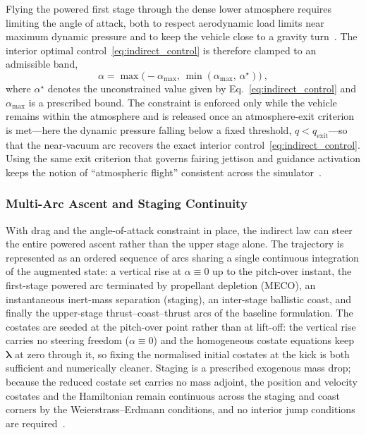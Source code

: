 Flying the powered first stage through the dense lower atmosphere requires limiting the angle of attack, both to respect aerodynamic load limits near maximum dynamic pressure and to keep the vehicle close to a gravity turn~\cite{Cremaschi2013TrajectoryOptimization}. The interior optimal control~\eqref{eq:indirect_control} is therefore clamped to an admissible band,
\begin{equation}
\alpha = \max\!\bigl(-\alpha_{\max},\,\min(\alpha_{\max},\,\alpha^{\star})\bigr) \ ,
\label{eq:fa_alpha_clamp}
\end{equation}
where $\alpha^{\star}$ denotes the unconstrained value given by Eq.~\eqref{eq:indirect_control} and $\alpha_{\max}$ is a prescribed bound. The constraint is enforced only while the vehicle remains within the atmosphere and is released once an atmosphere-exit criterion is met---here the dynamic pressure falling below a fixed threshold, $q < q_{\mathrm{exit}}$---so that the near-vacuum arc recovers the exact interior control~\eqref{eq:indirect_control}. Using the same exit criterion that governs fairing jettison and guidance activation keeps the notion of ``atmospheric flight'' consistent across the simulator~\cite{gath2001optimization}.

\subsubsection{Multi-Arc Ascent and Staging Continuity}
\label{sssec:fa_arcs}

With drag and the angle-of-attack constraint in place, the indirect law can steer the entire powered ascent rather than the upper stage alone. The trajectory is represented as an ordered sequence of arcs sharing a single continuous integration of the augmented state: a vertical rise at $\alpha\equiv 0$ up to the pitch-over instant, the first-stage powered arc terminated by propellant depletion (MECO), an instantaneous inert-mass separation (staging), an inter-stage ballistic coast, and finally the upper-stage thrust--coast--thrust arcs of the baseline formulation. The costates are seeded at the pitch-over point rather than at lift-off: the vertical rise carries no steering freedom ($\alpha\equiv 0$) and the homogeneous costate equations keep $\boldsymbol{\lambda}$ at zero through it, so fixing the normalised initial costates at the kick is both sufficient and numerically cleaner. Staging is a prescribed exogenous mass drop; because the reduced costate set carries no mass adjoint, the position and velocity costates and the Hamiltonian remain continuous across the staging and coast corners by the Weierstrass--Erdmann conditions, and no interior jump conditions are required~\cite{pontani2014particle,pontani2013ascent}.

